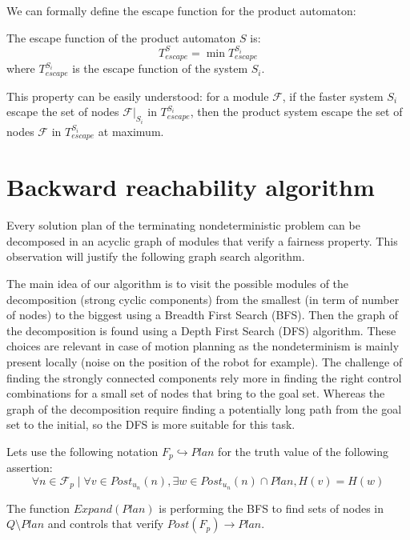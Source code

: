 We can formally define the escape function for the product automaton:
\begin{property}
The escape function of the product automaton $S$ is:
$$T_{escape}^S = \min{T_{escape}^{S_i}}$$
where $T_{escape}^{S_i}$ is the escape function of the system $S_i$.
\end{property}
This property can be easily understood: for a module $\mathcal{F}$, if the faster system $S_i$ escape the set of nodes $\mathcal{F}|_{S_i}$ in $T^{S_i}_{escape}$, then the product system escape the set of nodes $\mathcal{F}$ in $T^{S_i}_{escape}$ at maximum.

\section{Backward reachability algorithm}
Every solution plan of the terminating nondeterministic problem can be decomposed in an acyclic graph of modules that verify a fairness property.
This observation will justify the following graph search algorithm.

The main idea of our algorithm is to visit the possible modules of the decomposition (strong cyclic components) from the smallest (in term of number of nodes) to the biggest using a Breadth First Search (BFS).
Then the graph of the decomposition is found using a Depth First Search (DFS) algorithm.
These choices are relevant in case of motion planning as the nondeterminism is mainly present locally (noise on the position of the robot for example). The challenge of finding the strongly connected components rely more in finding the right control combinations for a small set of nodes that bring to the goal set.
Whereas the graph of the decomposition require finding a potentially long path from the goal set to the initial, so the DFS is more suitable for this task.

Lets use the following notation $F_p \hookrightarrow Plan$ for the truth value of the following assertion:
$$\forall n \in \mathcal{F}_p \mid \forall v \in Post_{u_n}(n), \exists w \in Post_{u_n}(n) \cap Plan, H(v)=H(w)$$

The function $Expand(Plan)$ is performing the BFS to find sets of nodes in $Q \setminus Plan$ and controls that verify $Post(F_p) \rightarrow Plan$.


